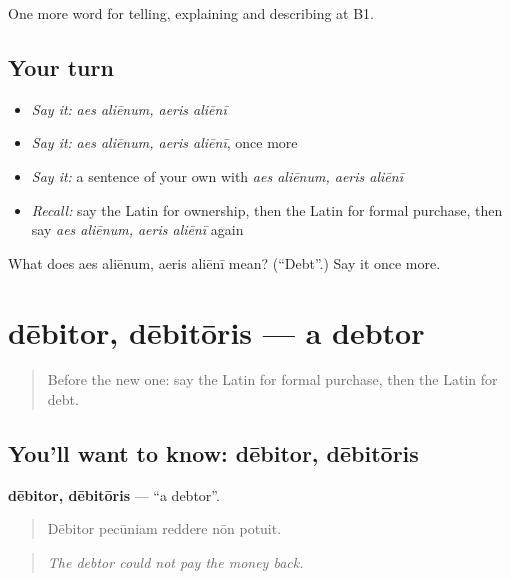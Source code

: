 \begin{grammarlens}[title={What you've built}]
One more word for telling, explaining and describing at B1.
\end{grammarlens}

\subsection*{Your turn}
\begin{itemize}
\raggedright
  \item \emph{Say it:} \emph{aes aliēnum, aeris aliēnī}
  \item \emph{Say it:} \emph{aes aliēnum, aeris aliēnī}, once more
  \item \emph{Say it:} a sentence of your own with \emph{aes aliēnum, aeris aliēnī}
  \item \emph{Recall:} say the Latin for ownership, then the Latin for formal purchase, then say \emph{aes aliēnum, aeris aliēnī} again
\end{itemize}

\begin{tcolorbox}[breakable,colback=teal!4,colframe=teal!35!black,title={Before you move on}]
What does aes aliēnum, aeris aliēnī mean? (\textquotedblleft{}Debt\textquotedblright{}.) Say it once more.
\end{tcolorbox}
\section[dēbitor, dēbitōris]{dēbitor, dēbitōris — a debtor}

\label{lesson:LA-C418-debitor}



\begin{quote}
Before the new one: say the Latin for formal purchase, then the Latin for debt.
\end{quote}

\subsection*{You'll want to know: dēbitor, dēbitōris}
\textbf{dēbitor, dēbitōris} — \textquotedblleft{}a debtor\textquotedblright{}.

\begin{quote}
Dēbitor pecūniam reddere nōn potuit.
\end{quote}

\begin{quote}
\emph{The debtor could not pay the money back.}
\end{quote}

